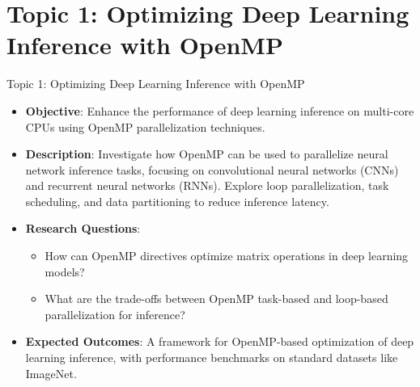 \documentclass[compress]{beamer}
\begin{document}
\section{Topic 1: Optimizing Deep Learning Inference with OpenMP}
\begin{frame}{Topic 1: Optimizing Deep Learning Inference with OpenMP}
    \begin{itemize}
        \item \textbf{Objective}: Enhance the performance of deep learning inference on multi-core CPUs using OpenMP parallelization techniques.
        \item \textbf{Description}: Investigate how OpenMP can be used to parallelize neural network inference tasks, focusing on convolutional neural networks (CNNs) and recurrent neural networks (RNNs). Explore loop parallelization, task scheduling, and data partitioning to reduce inference latency.
        \item \textbf{Research Questions}:
        \begin{itemize}
            \item How can OpenMP directives optimize matrix operations in deep learning models?
            \item What are the trade-offs between OpenMP task-based and loop-based parallelization for inference?
        \end{itemize}
        \item \textbf{Expected Outcomes}: A framework for OpenMP-based optimization of deep learning inference, with performance benchmarks on standard datasets like ImageNet.
    \end{itemize}
\end{frame}

\end{document}
